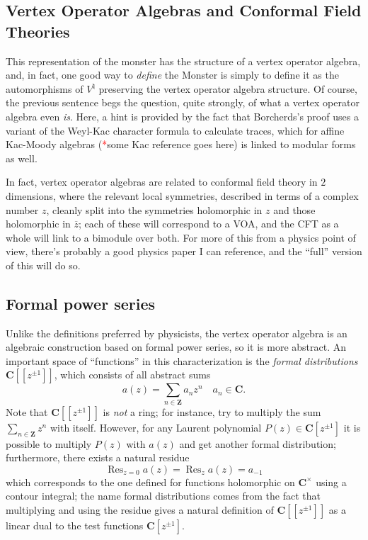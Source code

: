 \documentclass{article}
\newcommand{\CC}{\mathbold{C}}
\newcommand{\ZZ}{\mathbold{Z}}
\newcommand{\tk}{\textcolor{red}{*}}
\DeclareMathOperator{\Res}{Res}
\begin{document}
\subsection{Vertex Operator Algebras and Conformal Field Theories}
This representation of the monster has the structure of a vertex operator algebra, and, in fact, one good way to \textit{define} the Monster is simply to define it as the automorphisms of $V^\natural$ preserving the vertex operator algebra structure.  Of course, the previous sentence begs the question, quite strongly, of what a vertex operator algebra even \textit{is}.  Here, a hint is provided by the fact that Borcherds's proof uses a variant of the Weyl-Kac character formula to calculate traces, which for affine Kac-Moody algebras (\tk some Kac reference goes here) is linked to modular forms as well.

In fact, vertex operator algebras are related to conformal field theory in $2$ dimensions, where the relevant local symmetries, described in terms of a complex number $z$, cleanly split into the symmetries holomorphic in $z$ and those holomorphic in $\overline{z}$; each of these will correspond to a VOA, and the CFT as a whole will link to a bimodule over both.  For more of this from a physics point of view, there's probably a good physics paper I can reference, and the ``full'' version of this will do so.

\subsection{Formal power series}

Unlike the definitions preferred by physicists, the vertex operator algebra is an algebraic construction based on formal power series, so it is more abstract.  An important space of ``functions'' in this characterization is the \textit{formal distributions} $\CC[[z^{\pm 1}]]$, which consists of all abstract sums
\[a(z)=\sum_{n \in \ZZ} a_n z^n \quad a_n \in \CC. \]
Note that $\CC[[z^{\pm 1}]]$ is \textit{not} a ring; for instance, try to multiply the sum $\sum_{n \in \ZZ} z^n$ with itself.  However, for any Laurent polynomial $P(z) \in \CC[z^{\pm 1}]$ it is possible to multiply $P(z)$ with $a(z)$ and get another formal distribution; furthermore, there exists a natural residue
\[\Res_{z=0} a(z)=\Res_z a(z)=a_{-1} \]
which corresponds to the one defined for functions holomorphic on $\CC^\times$ using a contour integral; the name formal distributions comes from the fact that multiplying and using the residue gives a natural definition of $\CC[[z^{\pm 1}]]$ as a linear dual to the test functions $\CC[z^{\pm 1}]$.
\end{document}
